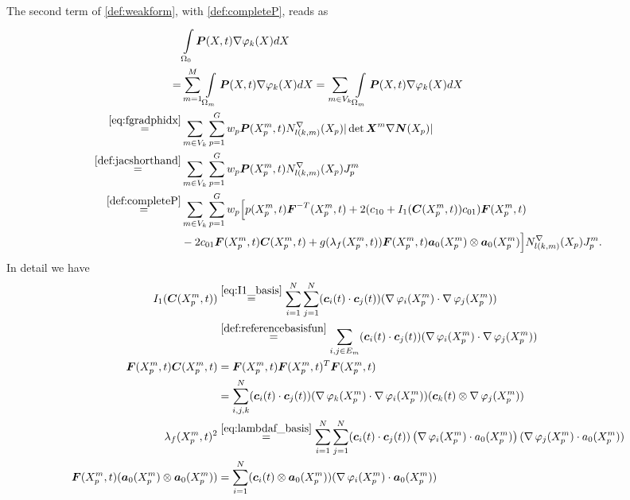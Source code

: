 The second term of \eqref{def:weakform}, with \eqref{def:completeP}, reads as
\begin{align*}
		&\intor\vP(X,t)\dpk dX\\
		=& \suml{m=1}{M}\intl{\Omega_m}{}\vP(X,t)\dpk dX
			= \sumvk\intl{\Omega_m}{}\vP(X,t)\dpk dX\\
		\re{eq:fgradphidx}&\sumvk\sumgp w_p\vP(\pmp,t)\dNkmp|\det \vX^m\nabla\vN(X_p)|\\
		\re{def:jacshorthand}&\sumvk\sumgp w_p\vP(\pmp,t)\dNkmp\jmp\\
		\re{def:completeP}&\sumvk\sumgp w_p\Bigl[p(\pmp,t)\vF^{-T}(\pmp,t) + 2(c_{10} + I_1(\vC(\pmp,t))c_{01})\vF(\pmp,t)\\
			 &- 2c_{01}\vF(\pmp,t)\vC(\pmp,t)+g(\lambda_f(\pmp,t))\vF(\pmp,t)\va_0(\pmp)\otimes\va_0(\pmp)\Bigr]\dNkmp\jmp\nonumber.
\end{align*}
In detail we have
\begin{align*}
	I_1(\vC(\pmp,t)) &\re{eq:I1_basis} \sumi\sumj (\vc_i(t) \cdot \vc_j(t))(\divergence\varphi_i(\pmp) \cdot \divergence\varphi_j(\pmp))\\
	&\re{def:referencebasisfun} \suml{i,j\in E_m}{} (\vc_i(t) \cdot \vc_j(t))(\divergence\varphi_i(\pmp) \cdot \divergence\varphi_j(\pmp))\\
	\vF(\pmp,t)\vC(\pmp,t) &= \vF(\pmp,t)\vF(\pmp,t)^T\vF(\pmp,t)\\
    	&= \suml{i,j,k}{N}(\vc_i(t)\cdot \vc_j(t))(\divergence\varphi_k(\pmp)\cdot\divergence\varphi_i(\pmp))(\vc_k(t)\otimes\divergence\varphi_j(\pmp))\\
    \lambda_f(\pmp,t)^2 &\re{eq:lambdaf_basis}
    		\sumi\sumj (\vc_i(t)\cdot \vc_j(t))\left(\divergence\varphi_i(\pmp)\cdot a_0(\pmp)\right)(\divergence\varphi_j(\pmp)\cdot a_0(\pmp))\nonumber\\
    \vF(\pmp,t)(\va_0(\pmp)\otimes\va_0(\pmp)) 
    	&= \sumi (\vc_i(t)\otimes \va_0(\pmp))(\divergence\varphi_i(\pmp)\cdot\va_0(\pmp))\nonumber\\
\end{align*}

